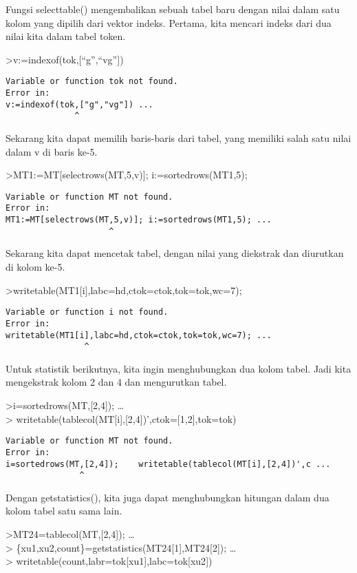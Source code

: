 \documentclass[
]{book}
\begin{document}
Fungsi selecttable() mengembalikan sebuah tabel baru dengan nilai dalam satu kolom yang dipilih dari vektor indeks. Pertama, kita mencari indeks dari dua nilai kita dalam tabel token.

\textgreater v:=indexof(tok,{[}``g'',``vg''{]})

\begin{verbatim}
Variable or function tok not found.
Error in:
v:=indexof(tok,["g","vg"]) ...
              ^
\end{verbatim}

Sekarang kita dapat memilih baris-baris dari tabel, yang memiliki salah satu nilai dalam v di baris ke-5.

\textgreater MT1:=MT{[}selectrows(MT,5,v){]}; i:=sortedrows(MT1,5);

\begin{verbatim}
Variable or function MT not found.
Error in:
MT1:=MT[selectrows(MT,5,v)]; i:=sortedrows(MT1,5); ...
                     ^
\end{verbatim}

Sekarang kita dapat mencetak tabel, dengan nilai yang diekstrak dan diurutkan di kolom ke-5.

\textgreater writetable(MT1{[}i{]},labc=hd,ctok=ctok,tok=tok,wc=7);

\begin{verbatim}
Variable or function i not found.
Error in:
writetable(MT1[i],labc=hd,ctok=ctok,tok=tok,wc=7); ...
                ^
\end{verbatim}

Untuk statistik berikutnya, kita ingin menghubungkan dua kolom tabel. Jadi kita mengekstrak kolom 2 dan 4 dan mengurutkan tabel.

\textgreater i=sortedrows(MT,{[}2,4{]}); \ldots{}\\
\textgreater{} writetable(tablecol(MT{[}i{]},{[}2,4{]})',ctok={[}1,2{]},tok=tok)

\begin{verbatim}
Variable or function MT not found.
Error in:
i=sortedrows(MT,[2,4]);    writetable(tablecol(MT[i],[2,4])',c ...
               ^
\end{verbatim}

Dengan getstatistics(), kita juga dapat menghubungkan hitungan dalam dua kolom tabel satu sama lain.

\textgreater MT24=tablecol(MT,{[}2,4{]}); \ldots{}\\
\textgreater{} \{xu1,xu2,count\}=getstatistics(MT24{[}1{]},MT24{[}2{]}); \ldots{}\\
\textgreater{} writetable(count,labr=tok{[}xu1{]},labc=tok{[}xu2{]})
\end{document}
